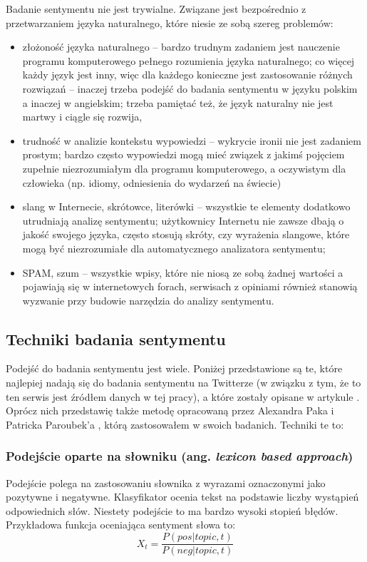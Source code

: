 Badanie sentymentu nie jest trywialne. Związane jest bezpośrednio z 
przetwarzaniem języka naturalnego, które niesie ze sobą szereg problemów:

\begin{itemize}
  \item złożoność języka naturalnego -- bardzo trudnym zadaniem jest nauczenie 
programu komputerowego pełnego rozumienia języka naturalnego; co więcej każdy
język jest inny, więc dla każdego konieczne jest zastosowanie różnych
rozwiązań -- inaczej trzeba podejść do badania sentymentu w języku polskim
a inaczej w angielskim; trzeba pamiętać też, że język naturalny nie jest martwy 
i ciągle się rozwija,
\item trudność w analizie kontekstu wypowiedzi -- wykrycie ironii nie jest zadaniem 
prostym; bardzo często wypowiedzi mogą mieć związek z jakimś pojęciem 
zupełnie niezrozumiałym dla programu komputerowego, a oczywistym dla człowieka
(np. idiomy, odniesienia do wydarzeń na świecie)
\item slang w Internecie, skrótowce, literówki -- wszystkie te elementy
dodatkowo utrudniają analizę sentymentu; użytkownicy Internetu nie zawsze
dbają o jakość swojego języka, często stosują skróty, czy wyrażenia slangowe, 
które mogą być niezrozumiałe dla automatycznego analizatora sentymentu;
\item SPAM, szum -- wszystkie wpisy, które nie niosą ze sobą żadnej wartości
a pojawiają się w internetowych forach, serwisach z opiniami również stanowią
wyzwanie przy budowie narzędzia do analizy sentymentu.
\end{itemize}


\subsection{Techniki badania sentymentu}
Podejść do badania sentymentu jest wiele. Poniżej przedstawione są te, które
najlepiej nadają się do badania sentymentu na Twitterze (w związku z tym, że to
ten serwis jest źródłem danych w tej pracy), a które zostały opisane w artykule 
\cite{sentimentTechniques}. Oprócz nich przedstawię także metodę opracowaną
przez Alexandra Paka i Patricka Paroubek'a \cite{pakParoubekSentiment}, którą 
zastosowałem w swoich badanich. Techniki te to:

\subsubsection{Podejście oparte na słowniku (ang. \textit{lexicon based approach})}
Podejście polega na zastosowaniu słownika z wyrazami oznaczonymi jako pozytywne
i negatywne. Klasyfikator ocenia tekst na podstawie liczby wystąpień
odpowiednich słów. Niestety podejście to ma bardzo wysoki stopień błędów.
Przykładowa funkcja oceniająca sentyment słowa to:
\begin{equation}
X_t = \frac{P(pos | topic, t)}{P(neg | topic, t)}
\end{equation}

